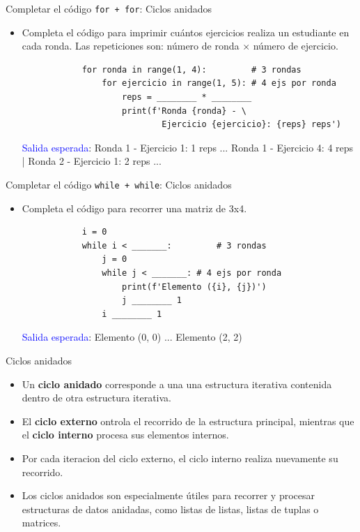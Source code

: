 \documentclass{beamer}
\begin{document}
    \begin{frame}[fragile, t]{Completar el código \texttt{for + for}: Ciclos anidados}
        \begin{itemize}
            \item Completa el código para imprimir cuántos ejercicios realiza un estudiante en cada ronda. Las repeticiones son: número de ronda × número de ejercicio.
            \begin{verbatim}
            for ronda in range(1, 4):         # 3 rondas
                for ejercicio in range(1, 5): # 4 ejs por ronda
                    reps = ________ * ________
                    print(f'Ronda {ronda} - \ 
                            Ejercicio {ejercicio}: {reps} reps')
            \end{verbatim}
            \textcolor{blue}{Salida esperada}: Ronda 1 - Ejercicio 1: 1 reps  ...  Ronda 1 - Ejercicio 4: 4 reps  |  Ronda 2 - Ejercicio 1: 2 reps  ...
        \end{itemize}
    \end{frame}

    \begin{frame}[fragile, t]{Completar el código \texttt{while + while}: Ciclos anidados}
        \begin{itemize}
            \item Completa el código para recorrer una matriz de 3x4.
            \begin{verbatim}
            i = 0
            while i < _______:         # 3 rondas
                j = 0
                while j < _______: # 4 ejs por ronda
                    print(f'Elemento ({i}, {j})')
                    j ________ 1
                i ________ 1
            \end{verbatim}
            \textcolor{blue}{Salida esperada}: Elemento (0, 0)  ...  Elemento (2, 2)
        \end{itemize}
    \end{frame}

    \begin{frame}[fragile, t]{Ciclos anidados}
        \begin{itemize}
            \item Un \textbf{ciclo anidado} corresponde a una una estructura iterativa contenida dentro de otra estructura iterativa.
            \item El \textbf{ciclo externo} ontrola el recorrido de la estructura principal, mientras que el \textbf{ciclo interno} procesa sus elementos internos.
            \item Por cada iteracion del ciclo externo, el ciclo interno realiza nuevamente su recorrido.
            \item Los ciclos anidados son especialmente útiles para recorrer y procesar estructuras de datos anidadas, como listas de listas, listas de tuplas o matrices.
        \end{itemize}
    \end{frame}
\end{document}
